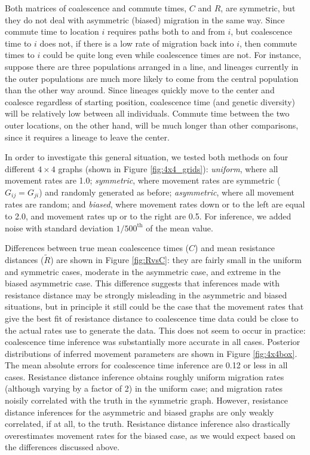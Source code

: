 \documentclass{article}
\newcommand{\comdist}{\widetilde{R}}
\begin{document}
Both matrices of coalescence and commute times, $C$ and $R$, are symmetric,
but they do not deal with asymmetric (biased) migration in the same way.
Since commute time to location $i$ requires paths both to and from $i$,
but coalescence time to $i$ does not,
if there is a low rate of migration back into $i$,
then commute times to $i$ could be quite long even while coalescence times are not.
For instance, suppose there are three populations arranged in a line,
and lineages currently in the outer populations are much more likely to come from the central population
than the other way around.
Since lineages quickly move to the center and coalesce regardless of starting position, 
coalescence time (and genetic diversity) will be relatively low between all individuals. 
Commute time between the two outer locations, on the other hand,
will be much longer than other comparisons, since it requires a lineage to leave the center.

In order to investigate this general situation,
we tested both methods on four different $4 \times 4$ graphs (shown in Figure \ref{fig:4x4_grids}):
\emph{uniform}, where all movement rates are 1.0;
\emph{symmetric}, where movement rates are symmetric ($G_{ij} = G_{ji}$)
and randomly generated as before;
\emph{asymmetric}, where all movement rates are random;
and \emph{biased}, where movement rates down or to the left are equal to 2.0,
and movement rates up or to the right are 0.5.
For inference, we added noise with standard deviation $1/500^\text{th}$ of the mean value.

Differences between true mean coalescence times ($C$) and mean resistance distances ($\comdist$)
are shown in Figure \ref{fig:RvsC}: 
they are fairly small in the uniform and symmetric cases, moderate in the asymmetric case, 
and extreme in the biased asymmetric case.
This difference suggests that inferences made with resistance distance 
may be strongly misleading 
in the asymmetric and biased situations,
but in principle it still could be the case that 
the movement rates that give the best fit of resistance distance
to coalescence time data could be close to the actual rates use to generate the data.
This does not seem to occur in practice:
coalescence time inference was substantially more accurate in all cases.
Posterior distributions of inferred movement parameters are shown in Figure \ref{fig:4x4box}.
The mean absolute errors for coalescence time inference are 0.12 or less in all cases.
Resistance distance inference obtains roughly uniform migration rates
(although varying by a factor of 2) in the uniform case;
and migration rates noisily correlated with the truth in the symmetric graph.
However, resistance distance inferences for the asymmetric and biased graphs are only weakly correlated, 
if at all, to the truth.
Resistance distance inference also drastically overestimates movement rates for the biased case,
as we would expect based on the differences discussed above.
\end{document}
